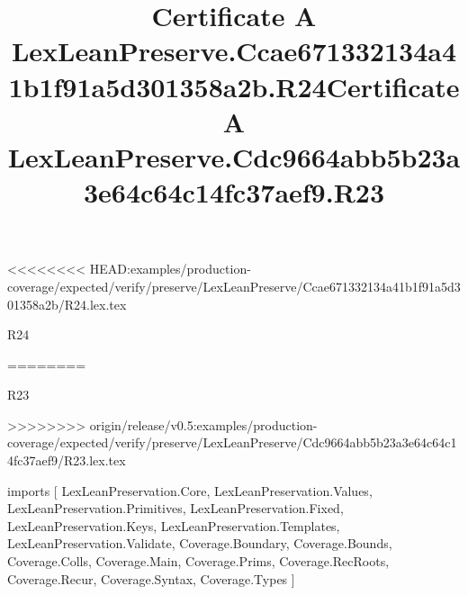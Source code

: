 <<<<<<<< HEAD:examples/production-coverage/expected/verify/preserve/LexLeanPreserve/Ccae671332134a41b1f91a5d301358a2b/R24.lex.tex
\begin{lexlean}{R24}
\title{Certificate A LexLeanPreserve.Ccae671332134a41b1f91a5d301358a2b.R24}
========
\begin{lexlean}{R23}
\title{Certificate A LexLeanPreserve.Cdc9664abb5b23a3e64c64c14fc37aef9.R23}
>>>>>>>> origin/release/v0.5:examples/production-coverage/expected/verify/preserve/LexLeanPreserve/Cdc9664abb5b23a3e64c64c14fc37aef9/R23.lex.tex
\begin{coremodule}
imports [
  LexLeanPreservation.Core,
  LexLeanPreservation.Values,
  LexLeanPreservation.Primitives,
  LexLeanPreservation.Fixed,
  LexLeanPreservation.Keys,
  LexLeanPreservation.Templates,
  LexLeanPreservation.Validate,
  Coverage.Boundary,
  Coverage.Bounds,
  Coverage.Colls,
  Coverage.Main,
  Coverage.Prims,
  Coverage.RecRoots,
  Coverage.Recur,
  Coverage.Syntax,
  Coverage.Types
]


\end{coremodule}
\end{lexlean}
\end{lexlean}
